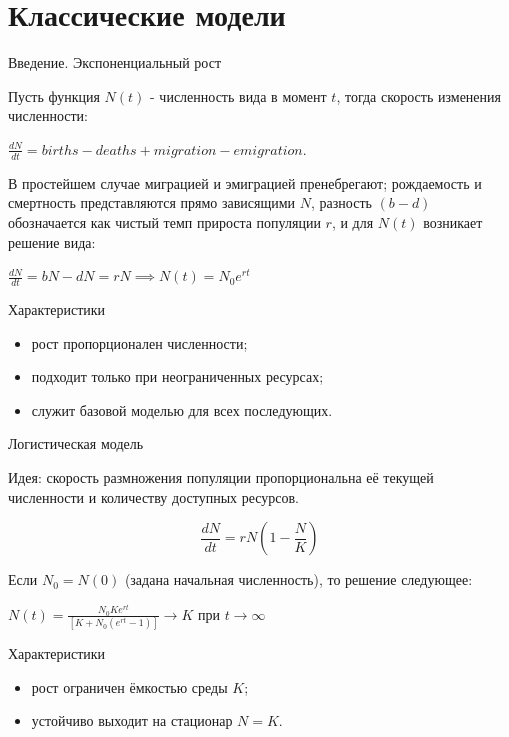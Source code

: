 \documentclass[12pt]{beamer}
\begin{document}
\section{Классические модели}

\begin{frame}{Введение. Экспоненциальный рост}

Пусть функция $N(t)$ - численность вида в момент $t$, тогда скорость изменения численности: 

\begin{center}
$\frac{dN}{dt}= births-deaths+migration-emigration.$
\end{center}

В простейшем случае миграцией и эмиграцией пренебрегают; рождаемость и смертность представляются прямо зависящими $N$, разность $(b-d)$ обозначается как чистый темп прироста популяции $r$, и для $ N(t)$ возникает решение вида:

\begin{center}
$\frac{dN}{dt}= bN-dN = rN \implies N(t) = N_0e^{rt}$
\end{center}

\begin{exampleblock}{Характеристики}
\begin{itemize}
    \item рост пропорционален численности;
    \item подходит только при неограниченных ресурсах;
    \item служит базовой моделью для всех последующих.
\end{itemize}
\end{exampleblock}

\end{frame}

\begin{frame}{Логистическая модель}

Идея: скорость размножения популяции пропорциональна её текущей численности и количеству доступных ресурсов.

\[
\frac{dN}{dt}=rN\left(1-\frac{N}{K}\right)
\]

Если $N_0 = N(0)$ (задана начальная численность), то решение следующее:

\begin{center}
$N(t) = \frac{N_0Ke^{rt}}{[K+N_0(e^{rt}-1)]} \to K$ при $t \to \infty$
\end{center}

\begin{exampleblock}{Характеристики}
\begin{itemize}
    \item рост ограничен ёмкостью среды $K$;
    \item устойчиво выходит на стационар $N=K$.
\end{itemize}
\end{exampleblock}

\end{frame}
\end{document}
